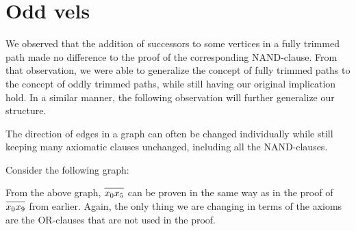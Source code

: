 
\section{Odd vels}
\label{sec:Odd vels}
We observed that the addition of successors to some vertices in a fully trimmed path made no difference to the proof of the corresponding NAND-clause.
From that observation, we were able to generalize the concept of fully trimmed paths to the concept of oddly trimmed paths, while still having our original implication hold.
In a similar manner, the following observation will further generalize our structure.

The direction of edges in a graph can often be changed individually while still keeping many axiomatic clauses unchanged, including all the NAND-clauses.

Consider the following graph:\par
\begin{figure}[!h]
  \centering
  \caption{}
  \label{fig:vel-example}
\end{figure}
From the above graph, $\ol{x_0x_5}$ can be proven in the same way as in the proof of $\ol{x_0x_9}$ from earlier.
Again, the only thing we are changing in terms of the axioms are the OR-clauses that are not used in the proof.

